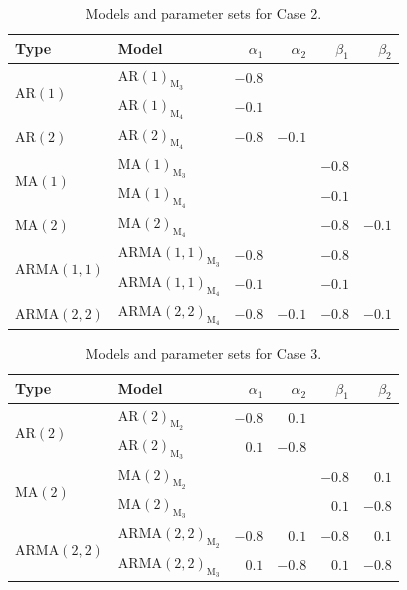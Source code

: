 \documentclass[12pt,a4paper]{article}
\begin{document}
	\begin{table}[H]
		\centering
		\begin{tabular}{llrrrr}
			\toprule
			\textbf{Type} & \textbf{Model} & $\alpha_1$ & $\alpha_2$ & $\beta_1$ & $\beta_2$ \\
			\midrule
			\multirow{2}{*}{$\mathrm{AR}(1)$}     
			& $\mathrm{AR}(1)_{\textrm{M}_3}$   & $-0.8$  &      &      &      \\
			& $\mathrm{AR}(1)_{\textrm{M}_4}$   & $-0.1$  &      &      &      \\
			\midrule
			\multirow{1}{*}{$\mathrm{AR}(2)$}      
			& $\mathrm{AR}(2)_{\textrm{M}_4}$  & $-0.8$  & $-0.1$ &      &      \\
			\midrule
			\multirow{2}{*}{	$\mathrm{MA}(1)$}      
			& $\mathrm{MA}(1)_{\textrm{M}_3}$  &       &      & $-0.8$ &      \\
			& $\mathrm{MA}(1)_{\textrm{M}_4}$  &       &      & $-0.1$ &      \\
			\midrule
			\multirow{1}{*}{$\mathrm{MA}(2)$}      
			& $\mathrm{MA}(2)_{\textrm{M}_4}$  &       &      & $-0.8$ & $-0.1$ \\
			\midrule
			\multirow{2}{*}{$\mathrm{ARMA}(1,1)$}  
			& $\mathrm{ARMA}(1,1)_{\textrm{M}_3}$ & $-0.8$ &     & $-0.8$ &      \\
			& $\mathrm{ARMA}(1,1)_{\textrm{M}_4}$ & $-0.1$ &     & $-0.1$ &      \\
			\midrule
			\multirow{1}{*}{$\mathrm{ARMA}(2,2)$}  
			& $\mathrm{ARMA}(2,2)_{\textrm{M}_4}$ & $-0.8$ & $-0.1$ & $-0.8$ & $-0.1$ \\
			\bottomrule
		\end{tabular}
		\caption{Models and parameter sets for Case 2.}
		\label{tab:case2}
	\end{table}
	
	\begin{table}[H]
		\centering
		\begin{tabular}{llrrrr}
			\toprule
			\textbf{Type} & \textbf{Model} & $\alpha_1$ & $\alpha_2$ & $\beta_1$ & $\beta_2$ \\
			\midrule
			\multirow{2}{*}{$\mathrm{AR}(2)$}      
			& $\mathrm{AR}(2)_{\textrm{M}_2}$  & $-0.8$  & $0.1$  &      &      \\
			& $\mathrm{AR}(2)_{\textrm{M}_3}$  & $0.1$   & $-0.8$ &      &      \\
			\midrule
			\multirow{2}{*}{$\mathrm{MA}(2)$}      
			& $\mathrm{MA}(2)_{\textrm{M}_2}$  &       &      & $-0.8$ & $0.1$  \\
			& $\mathrm{MA}(2)_{\textrm{M}_3}$  &       &      & $0.1$  & $-0.8$ \\
			\midrule
			\multirow{2}{*}{$\mathrm{ARMA}(2,2)$}  
			& $\mathrm{ARMA}(2,2)_{\textrm{M}_2}$ & $-0.8$ & $0.1$ & $-0.8$ & $0.1$  \\
			& $\mathrm{ARMA}(2,2)_{\textrm{M}_3}$ & $0.1$ & $-0.8$ & $0.1$  & $-0.8$ \\
			\bottomrule
		\end{tabular}
		\caption{Models and parameter sets for Case 3.}
		\label{tab:case3}
	\end{table}
	
\end{document}
